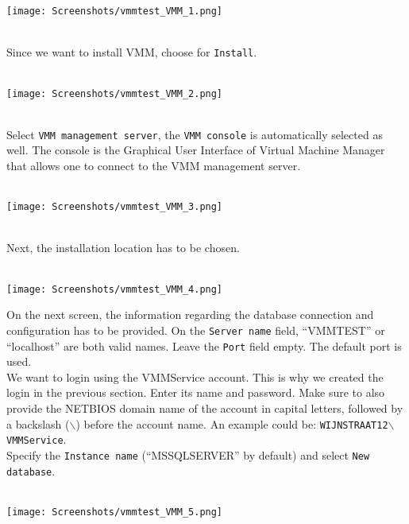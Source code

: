 \noindent\begin{minipage}{\textwidth}
    \centering
    \texttt{[image: Screenshots/vmmtest\_VMM\_1.png]}
\end{minipage}
$\;$ \\ \\
Since we want to install VMM, choose for \texttt{Install}.
$\;$ \\ \\
\noindent\begin{minipage}{\textwidth}
    \centering
    \texttt{[image: Screenshots/vmmtest\_VMM\_2.png]}
\end{minipage}
$\;$ \\ \\
Select \texttt{VMM management server}, the \texttt{VMM console} is automatically selected as well. The console is the Graphical User Interface of Virtual Machine Manager that allows one to connect to the VMM management server.
$\;$ \\ \\
\noindent\begin{minipage}{\textwidth}
    \centering
    \texttt{[image: Screenshots/vmmtest\_VMM\_3.png]}
\end{minipage}
$\;$ \\ \\
Next, the installation location has to be chosen.
$\;$ \\ \\
\noindent\begin{minipage}{\textwidth}
    \centering
    \texttt{[image: Screenshots/vmmtest\_VMM\_4.png]}
\end{minipage}

\clearpage

On the next screen, the information regarding the database connection and configuration has to be provided. On the \texttt{Server name} field, ``VMMTEST'' or ``localhost'' are both valid names. Leave the \texttt{Port} field empty. The default port is used. \\
We want to login using the VMMService account. This is why we created the login in the previous section. Enter its name and password. Make sure to also provide the NETBIOS domain name of the account in capital letters, followed by a backslash ($\backslash$) before the account name. An example could be: \texttt{WIJNSTRAAT12$\backslash$VMMService}.\\
Specify the \texttt{Instance name} (``MSSQLSERVER'' by default) and select \texttt{New database}.
$\;$ \\ \\
\noindent\begin{minipage}{\textwidth}
    \centering
    \texttt{[image: Screenshots/vmmtest\_VMM\_5.png]}
\end{minipage}


